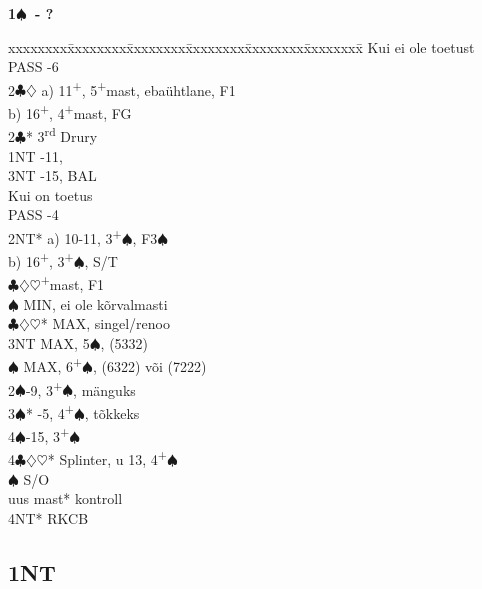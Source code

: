\documentclass[10pt]{article}
\renewcommand{\c}{$\clubsuit$}
\renewcommand{\d}{$\diamondsuit$}
\newcommand{\h}{$\heartsuit$}
\newcommand{\s}{$\spadesuit$}
\newcommand{\p}{\textsuperscript{+}}
\newcommand{\rdh}{3\textsuperscript{rd}}
\newenvironment{bidtable}[1][]
{\textbf{#1}
  \begin{adjustwidth}{1em}{}
    \addvspace{2pt}
    \begin{tabbing}
      xxxxxxxx\=xxxxxxxx\=xxxxxxxx\=xxxxxxxx\=xxxxxxxx\=xxxxxxxx\=\kill}
{\end{tabbing}\end{adjustwidth}\bigskip}%
\begin{document}
\begin{multicols*}{2}
\textbf{1\s\ - ?}
\begin{bidtable}
Kui ei ole toetust                                      \\
PASS      -6                                        \\
2\c\d     \> a) 11\p, 5\p mast, ebaühtlane, F1          \\
          \> b) 16\p, 4\p mast, FG                      \\
2\c* \rdh \> Drury                                      \\
1NT       -11,                                      \\
3NT       -15, BAL                                 \\
Kui on toetus                                           \\
PASS      -4                                        \\
2NT*      \> a) 10-11, 3\p\s, F3\s                      \\
          \> b) 16\p, 3\p\s, S/T                        \\
          \c\d\h   {}\p mast, F1                  \\
          \s       \> MIN, ei ole kõrvalmasti       \\
          \c\d\h*  \> MAX, singel/renoo             \\
          \> 3NT       \> MAX, 5\s, (5332)              \\
          \s       \> MAX, 6\p\s, (6322) või (7222) \\
2\s       {}-9, 3\p\s, mänguks                        \\
3\s*      {}-5, 4\p\s, tõkkeks                        \\
4\s       {}-15, 3\p\s                               \\
4\c\d\h*  \> Splinter, u 13, 4\p\s                      \\
          \s       \> S/O                           \\
          \> uus mast* \> kontroll                      \\
          \> 4NT*      \> RKCB
\end{bidtable}


\newpage
\subsection{1NT}


\end{multicols*}
\end{document}
